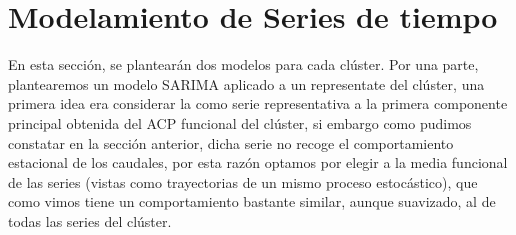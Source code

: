 \documentclass[12pt,oneside]{book}\usepackage[]{graphicx}\usepackage[]{color}
\theoremstyle{definition} %
\begin{document}
% 
% 
% 
% 
% 




\section{Modelamiento de Series de tiempo}

En esta sección, se plantearán dos modelos para cada clúster. Por una parte, plantearemos un modelo SARIMA aplicado a un representate del clúster, una primera idea era considerar la como serie representativa a la primera componente principal obtenida del ACP funcional del clúster, si embargo como pudimos constatar en la sección anterior, dicha serie no recoge el comportamiento estacional de los caudales, por esta razón optamos por elegir a la media funcional de las series (vistas como trayectorias de un mismo proceso estocástico), que como vimos tiene un comportamiento bastante similar, aunque suavizado, al de todas las series del clúster.
\end{document}
